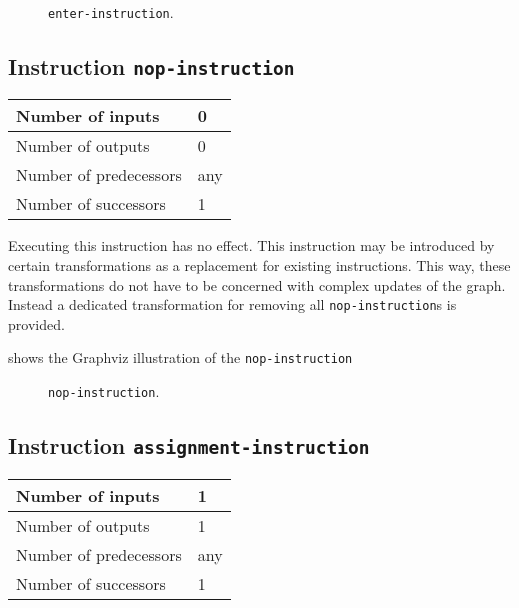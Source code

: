 \begin{figure}
\begin{center}
\end{center}
\caption{\label{fig-enter-instruction}
\texttt{enter-instruction}.}
\end{figure}

\subsection{Instruction \texttt{nop-instruction}}
\label{mir-instruction-nop}

\begin{tabular}{|l|l|}
\hline
Number of inputs & 0\\
\hline
Number of outputs & 0\\
\hline
Number of predecessors & any\\
\hline
Number of successors & 1\\
\hline
\end{tabular}

Executing this instruction has no effect.  This instruction may be
introduced by certain transformations as a replacement for existing
instructions.  This way, these transformations do not have to be
concerned with complex updates of the graph.  Instead a dedicated
transformation for removing all \texttt{nop-instruction}s is provided.

 shows the Graphviz illustration of the
\texttt{nop-instruction}

\begin{figure}
\begin{center}
\end{center}
\caption{\label{fig-nop-instruction}
\texttt{nop-instruction}.}
\end{figure}

\subsection{Instruction \texttt{assignment-instruction}}
\label{mir-instruction-assignment}

\begin{tabular}{|l|l|}
\hline
Number of inputs & 1\\
\hline
Number of outputs & 1\\
\hline
Number of predecessors & any\\
\hline
Number of successors & 1\\
\hline
\end{tabular}

